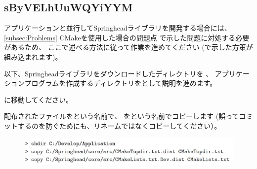 \subsection{sByVELhUuWQYiYYM}
\label{subsec:PrepareApplication}

\noindent
\KLUDGE アプリケーションと並行してSpringhead\KLUDGE ライブラリを開発する場合には、
\KQuoteS\ref{subsec:Problems} CMake\KLUDGE を使用した場合の問題点\KQuoteE
\KLUDGE で示した問題に対処する必要があるため、
\KLUDGE ここで述べる方法に従って作業を進めてください
(\KLUDGE で示した方策が組み込まれます)\KLUDGE 。

\medskip
\KLUDGE 以下、Springhead\KLUDGE ライブラリをダウンロードしたディレクトリを\SprTop{} \KLUDGE 、
\KLUDGE アプリケーションプログラムを作成するディレクトリを\AppTop{}\KLUDGE として説明を進めます。

\bigskip
\noindent
\AppTop{}\KLUDGE に移動してください。

\bigskip
\noindent
\KLUDGE 配布されたファイル\KLUDGE を\CMakeTopdir{}\KLUDGE という名前で、
\KLUDGE を\CMakeLists{}\KLUDGE という名前でコピーします
(\KLUDGE 誤ってコミットするのを防ぐためにも、リネームではなくコピーしてください）。

\medskip
\ifLwarp
	\begin{figure}[h]
	    \begin{center}
	    \includegraphics[width=\textwidth]{fig/command-3-1-a.eps}
	    \end{center}
	    \label{fig:DownloadTree}
	\end{figure}
\else
\begin{narrow}[15pt]
\end{narrow}
\fi

